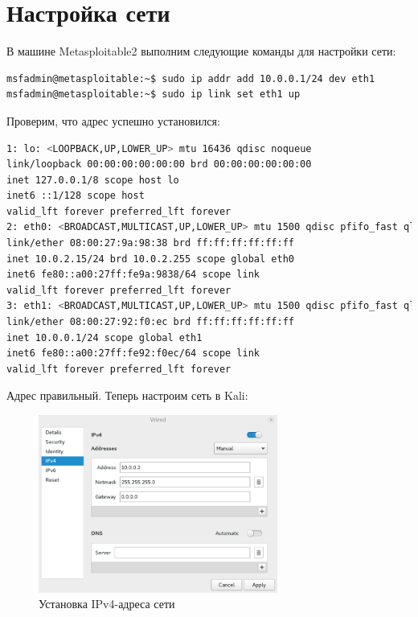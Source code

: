 \section{Настройка сети}

В машине Metasploitable2 выполним следующие команды для настройки сети:

\begin{lstlisting}[language=bash,caption={bash version}]
msfadmin@metasploitable:~$ sudo ip addr add 10.0.0.1/24 dev eth1
msfadmin@metasploitable:~$ sudo ip link set eth1 up
\end{lstlisting}

Проверим, что адрес успешно установился:

\begin{lstlisting}[language=bash]
1: lo: <LOOPBACK,UP,LOWER_UP> mtu 16436 qdisc noqueue 
link/loopback 00:00:00:00:00:00 brd 00:00:00:00:00:00
inet 127.0.0.1/8 scope host lo
inet6 ::1/128 scope host 
valid_lft forever preferred_lft forever
2: eth0: <BROADCAST,MULTICAST,UP,LOWER_UP> mtu 1500 qdisc pfifo_fast qlen 1000
link/ether 08:00:27:9a:98:38 brd ff:ff:ff:ff:ff:ff
inet 10.0.2.15/24 brd 10.0.2.255 scope global eth0
inet6 fe80::a00:27ff:fe9a:9838/64 scope link 
valid_lft forever preferred_lft forever
3: eth1: <BROADCAST,MULTICAST,UP,LOWER_UP> mtu 1500 qdisc pfifo_fast qlen 1000
link/ether 08:00:27:92:f0:ec brd ff:ff:ff:ff:ff:ff
inet 10.0.0.1/24 scope global eth1
inet6 fe80::a00:27ff:fe92:f0ec/64 scope link 
valid_lft forever preferred_lft forever
\end{lstlisting}

Адрес правильный. Теперь настроим сеть в Kali:

\begin{figure}[H]
	\centering
	\includegraphics[width=0.7\textwidth]{nm1.png}
	\caption{Установка IPv4-адреса сети}
\end{figure}

